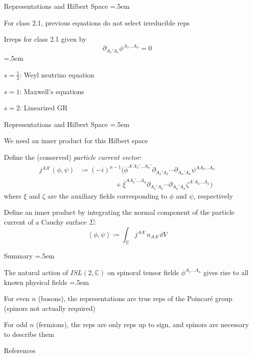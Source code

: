 \documentclass[xcolor={dvipsnames}]{beamer}
\let\olditemize=\itemize
\let\endolditemize=\enditemize
\renewenvironment{itemize}{\olditemize \itemsep=.5em }{\endolditemize}
\begin{document}
\begin{frame}{Representations and Hilbert Space}
    \begin{itemize}
        \item<1-> For class 2.1, previous equations do not select irreducible reps
        \item<2-> Irreps for class 2.1 given by \[ \partial_{A_1'A_1}\phi^{A_1\dots A_n} = 0 \]
        \begin{itemize}
            \item<3-> $s = \frac{1}{2}$: Weyl neutrino equation
            \item<4-> $s = 1$: Maxwell's equations
            \item<5-> $s = 2$: Linearized GR
        \end{itemize}
    \end{itemize}
\end{frame}

\begin{frame}{Representations and Hilbert Space}
    \begin{itemize}
        \item<1-> We need an inner product for this Hilbert space
        \item<2-> Define the (conserved) \textit{particle current vector}:
        \begin{align*}
            j^{AA'}(\phi, \psi) &\coloneqq (-i)^{n-1}\big( \overline{\phi}^{A'A_2'\dots A_n'}\partial_{A_2'A_2}\cdots\partial_{A_n'A_n}\psi^{AA_2\dots A_n} \\
            &\qquad\qquad\quad + \overline{\xi}^{AA_2'\dots A_n}\partial_{A_2'A_2}\cdots\partial_{A_n'A_n}\zeta^{A'A_2\dots A_n} \big) 
        \end{align*}
        where $\xi$ and $\zeta$ are the auxiliary fields corresponding to $\phi$ and $\psi$, respectively
        \item<3-> Define an inner product by integrating the normal component of the particle current of a Cauchy surface $\Sigma$:
        \[ \left<\phi, \psi\right> \coloneqq \int_\Sigma j^{AA'}n_{AA'}\dd V \]  
    \end{itemize}
\end{frame}

\begin{frame}{Summary}
    \begin{itemize}
        \item<2-> The natural action of $ISL(2, \mathbb{C})$ on spinoral tensor fields $\phi^{A_1\dots A_n}$ gives rise to all known physical fields
        \begin{itemize}
            \item<3-> For even $n$ (bosons), the representations are true reps of the Poincar\'e group (spinors not actually required)
            \item<4-> For odd $n$ (fermions), the reps are only reps up to sign, and spinors are necessary to describe them
        \end{itemize}  
    \end{itemize}    
\end{frame}

\begin{frame}{References}
    \nocite{wald:1984}
    \nocite{Wikipedia:2024}
    
    
\end{frame}
\end{document}
